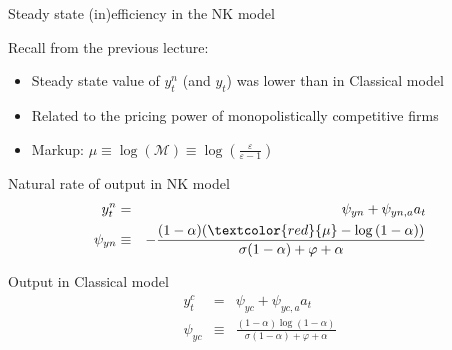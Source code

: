 \begin{frame}{Steady state (in)efficiency in the NK model}

Recall from the previous lecture:
\begin{itemize}
\item	Steady state value of $y^{n}_{t}$ (and $y_{t}$) was lower than in Classical model
\item	Related to the pricing power of monopolistically competitive firms
\item	Markup: $\mu \equiv \log{(\mathcal{M})} \equiv \log{(\frac{\varepsilon}{\varepsilon-1})}$
\end{itemize}

\vspace{2mm}
Natural rate of output in NK model
\begin{eqnarray*}
y^{n}_{t} 	&=& 		\psi_{yn} + \psi_{yn,a} a_{t} \\
\psi_{yn}	&\equiv& 	-\frac{(1-\alpha)(\textcolor{red}{\mu}-\log{(1-\alpha)})}{\sigma(1-\alpha)+\varphi+\alpha}
\end{eqnarray*}

Output in Classical model
\begin{eqnarray*}
y^{c}_{t} 		&=& 		\psi_{yc} + \psi_{yc,a} a_{t} \\
\psi_{yc} 		&\equiv& 	\frac{(1-\alpha)\log{(1-\alpha)}}{\sigma(1-\alpha)+\varphi+\alpha} \\
\end{eqnarray*}

\end{frame}


	
